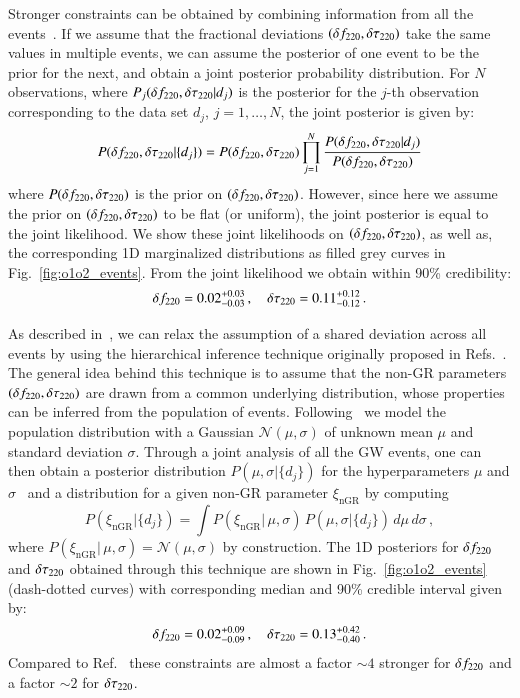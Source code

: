 Stronger constraints can be obtained by combining information from all the events~\cite{Abbott:2020jks}. If we assume that the fractional deviations $(\delta f_{\text{220}},\delta \tau_{\text{220}})$ take the same values in multiple events, we can assume
the posterior of one event to be the prior for the next, and obtain a
joint posterior probability distribution. For $N$ observations, where
$P_j(\delta f_{\text{220}}, \delta \tau_{\text{220}} | d_j)$ is the posterior for the $j$-th
observation corresponding to the data set $d_j$, $j=1,\dots,N$, the joint
posterior is given by:
%
\begin{equation}
P(\delta f_{\text{220}}, \delta \tau_{\text{220}} | \{d_j\}) = P(\delta f_{\text{220}}, \delta \tau_{\text{220}}) \prod _{j=1}^N \frac{P(\delta f_{\text{220}}, \delta \tau_{\text{220}} | d_j) }{P(\delta f_{\text{220}}, \delta \tau_{\text{220}})}
\end{equation}
%
where $P(\delta f_{\text{220}}, \delta \tau_{\text{220}})$ is the prior on $(\delta f_{\text{220}},
\delta \tau_{\text{220}})$. However, since here we assume the prior on $(\delta f_{\text{220}},
\delta \tau_{\text{220}})$ to be flat (or uniform), the joint posterior is equal to
the joint likelihood. We show these joint likelihoods on $(\delta f_{\text{220}}, \delta \tau_{\text{220}})$, as well as, the corresponding 1D marginalized distributions as filled grey curves in Fig.~\ref{fig:o1o2_events}. From the joint likelihood we obtain within 90\% credibility: 
%
\begin{equation}
\delta f_{\text{220}}=0.02^{+0.03}_{-0.03}\,,\quad \delta \tau_{\text{220}}=0.11^{+0.12}_{-0.12}\,.
\end{equation}
%


As described in~\cite{Abbott:2020jks}, we can relax the assumption of a shared deviation across all events by using the hierarchical inference technique originally proposed in Refs.~\cite{Zimmerman:2019wzo,Isi:2019asy}. The general idea behind this technique is to assume that the non-GR parameters $(\delta f_{\text{220}},\delta \tau_{\text{220}})$ are drawn from a common underlying distribution, whose properties can be inferred from the population of events. Following~\cite{Zimmerman:2019wzo,Isi:2019asy,Abbott:2020jks} we model the population distribution with a Gaussian  $\mathcal{N}(\mu,\sigma)$ of unknown mean $\mu$ and standard deviation $\sigma$. Through a joint analysis of all the GW events, one can then obtain a posterior distribution $P(\mu, \sigma |  \{d_j\}) $ for the hyperparameters $\mu$ and $\sigma$~\cite{Isi:2019asy} and a distribution for a given non-GR parameter $\xi_{\text{nGR}}$ by computing~\cite{Isi:2019asy}
%
\begin{equation}
P(\xi_{\text{nGR}} | \{d_j\}) = \int P(\xi_{\text{nGR}} |\, \mu, \sigma)\,P(\mu, \sigma |  \{d_j\})\,d\mu\,d\sigma \,,
\end{equation}
%
where $P(\xi_{\text{nGR}} | \,\mu, \sigma) = \mathcal{N}(\mu,\sigma)$ by construction. The 1D posteriors for $\delta f_{\text{220}}$ and $ \delta \tau_{\text{220}}$ obtained through this technique are shown in Fig.~\ref{fig:o1o2_events} (dash-dotted curves) with corresponding median and 90\% credible interval given by: 
%
\begin{equation}
\delta f_{\text{220}}=0.02^{+0.09}_{-0.09}\,,\quad \delta \tau_{\text{220}}=0.13^{+0.42}_{-0.40}\,.
\end{equation}
Compared to Ref.~\cite{Abbott:2020jks} these constraints are almost a factor $\sim 4$ stronger for $\delta f_{\text{220}}$ and a factor $\sim 2$ for $\delta \tau_{\text{220}}$. 


